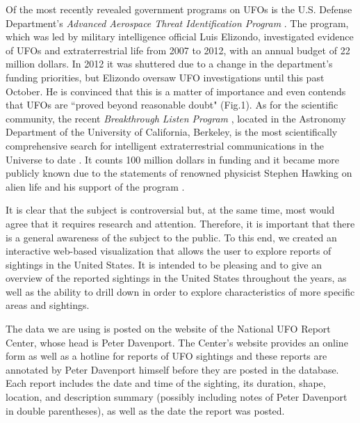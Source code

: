 \documentclass[journal]{vgtc}                %
\begin{document}
\indent Of the most recently revealed government programs on UFOs is the U.S. Defense Department's \textit{Advanced Aerospace Threat Identification Program} \cite{pentagon}. The program, which was led by military intelligence official Luis Elizondo, investigated evidence of UFOs and extraterrestrial life from 2007 to 2012, with an annual budget of 22 million dollars. In 2012 it was shuttered due to a change in the department's funding priorities, but Elizondo oversaw UFO investigations until this past October. He is convinced that this is a matter of importance and even contends that UFOs are ``proved beyond reasonable doubt" (Fig.1). As for the scientific community, the recent \textit{Breakthrough Listen Program} \cite{listen}, located in the Astronomy Department of the University of California, Berkeley, is the most scientifically comprehensive search for intelligent extraterrestrial communications in the Universe to date \cite{listenwiki}. It counts 100 million dollars in funding and it became more publicly known due to the statements of renowned physicist Stephen Hawking on alien life and his support of the program \cite{hawking}.

It is clear that the subject is controversial but, at the same time, most would agree that it requires research and attention. Therefore, it is important that there is a general awareness of the subject to the public. To this end, we created an interactive web-based visualization that allows the user to explore reports of sightings in the United States. It is intended to be pleasing and to give an overview of the reported sightings in the United States throughout the years, as well as the ability to drill down in order to explore characteristics of more specific areas and sightings.

The data we are using is posted on the website of the National UFO Report Center, whose head is Peter Davenport. The Center's website provides an online form as well as a hotline for reports of UFO sightings and these reports are annotated by Peter Davenport himself before they are posted in the database. Each report includes the date and time of the sighting, its duration, shape, location, and description summary (possibly including notes of Peter Davenport in double parentheses), as well as the date the report was posted.
\end{document}

